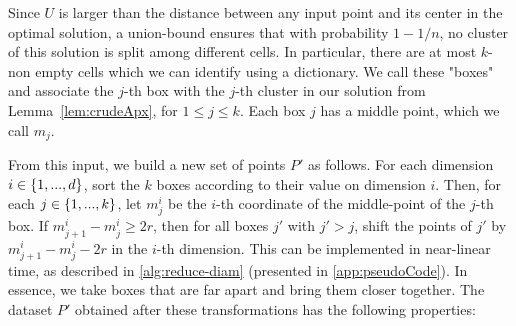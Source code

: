 Since $U$ is larger than the distance between any input point and its center in the optimal solution, a union-bound ensures that with probability $1-1/n$, no
cluster of this solution is split among different cells.  In particular, there are at most $k$-non empty cells which we can identify using a dictionary.  We
call these "boxes" and associate the $j$-th box with the $j$-th cluster in our solution from Lemma~\ref{lem:crudeApx}, for $1 \leq j \leq k$. Each box $j$ has
a middle point, which we call $m_j$.

From this input, we build a new set of points $P'$ as follows.  For each dimension $i \in \left\{ 1, ..., d \right\}$, sort the $k$ boxes according to their value on
dimension $i$. Then, for each $j \in \left\{ 1, ..., k\right\}$, let $m^i_j$  be the $i$-th coordinate of the middle-point of the $j$-th box. If $m^i_{j+1} - m^i_j
\geq 2r$, then for all boxes $j'$ with $j' > j$, shift the points of $j'$ by $m^i_{j+1} - m^i_j - 2r$ in the $i$-th dimension. This can be implemented in
near-linear time, as described in \cref{alg:reduce-diam} (presented in \cref{app:pseudoCode}). In essence, we take boxes that are far apart and bring them
closer together. The dataset $P'$ obtained after these transformations has the following properties:


